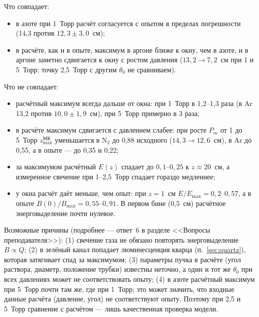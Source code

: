 \documentclass[12pt,a4paper]{article}
\newcommand{\Nt}{\mathrm{N_2}}
\begin{document}
\begin{enumerate}
        Что совпадает:
        \begin{itemize}
          \item в азоте при 1~Торр расчёт согласуется с опытом в пределах
                погрешности (14,3 против $12{,}3\pm3{,}0$~см);
          \item в расчёте, как и в опыте, максимум в аргоне ближе к окну,
                чем в азоте, и в аргоне заметно сдвигается к окну с ростом
                давления ($13{,}2\to 7{,}2$~см при 1 и 5~Торр; точку
                2,5~Торр с другим $\theta_0$ не сравниваем).
        \end{itemize}
        Что не совпадает:
        \begin{itemize}
          \item расчётный максимум всегда дальше от окна: при 1~Торр в
                1,2--1,3 раза (в Ar 13,2 против $10{,}0\pm1{,}9$~см), при
                5~Торр примерно в 3 раза;
          \item в расчёте максимум сдвигается с давлением слабее: при росте
                $P_m$ от 1 до 5~Торр $z_\text{max}^\text{МК}$ уменьшается в
                $\Nt$ до 0,88 исходного ($14{,}3\to12{,}6$~см), в Ar до
                0,55, а в опыте --- до 0,35 и 0,22;
          \item за максимумом расчётный $E(z)$ спадает до
                $0{,}1$--$0{,}25$ к $z\approx 20$~см, а измеренное свечение
                при 1--2,5~Торр спадает гораздо медленнее;
          \item у окна расчёт даёт меньше, чем опыт: при $z = 1$~см
                $E/E_\text{max} = 0{,}2$--$0{,}57$, а в опыте
                $B(0)/B_\text{max} = 0{,}55$--$0{,}91$. В первом бине
                (0,5~см) расчётное энерговыделение почти нулевое.
        \end{itemize}
        Возможные причины (подробнее --- ответ~6 в разделе <<Вопросы
        преподавателя>>): (1) свечение газа не обязано повторять
        энерговыделение $B\propto Q$; (2) в зелёный канал попадает
        люминесценция кварца (п.~\ref{sec:quartz}), которая затягивает спад
        за максимумом; (3) параметры пучка в расчёте (угол раствора,
        диаметр, положение трубки) известны неточно, а один и тот же
        $\theta_0$ при всех давлениях может не соответствовать опыту;
        (4) в азоте расчётный максимум при 5~Торр почти там же, где при
        1~Торр; это может значить, что входные данные расчёта (давление,
        угол) не соответствуют опыту. Поэтому при 2,5 и 5~Торр сравнение
        с расчётом --- лишь качественная проверка модели.

\end{enumerate}
\end{document}
